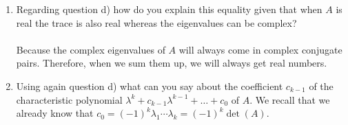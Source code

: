\documentclass[letter, 11pt]{article}
\begin{document}
\begin{enumerate}[wide = 0pt, label = \textbf{Problem \arabic*:}]
\begin{enumerate}
			\item {Regarding question d) how do you explain
				this equality given that when $ A $ is real the trace is also real whereas the eigenvalues can be complex?} \\ \\
			Because the complex eigenvalues of $ A $ will always come in complex conjugate pairs. Therefore, when we sum them up, we will always get real numbers. \\
			
			\item {Using again question d) what can you say about the coefficient $ c_{k-1} $ of the characteristic polynomial
				$ \lambda^k + c_{k-1} \lambda^{k-1} + \dots + c_0 $ of $ A $. We recall that we already know that $ c_0 = (-1)^k \lambda_1 \cdots \lambda_k = (-1)^k \det(A) $.}
		\end{enumerate}
	\end{enumerate}
\end{document}
